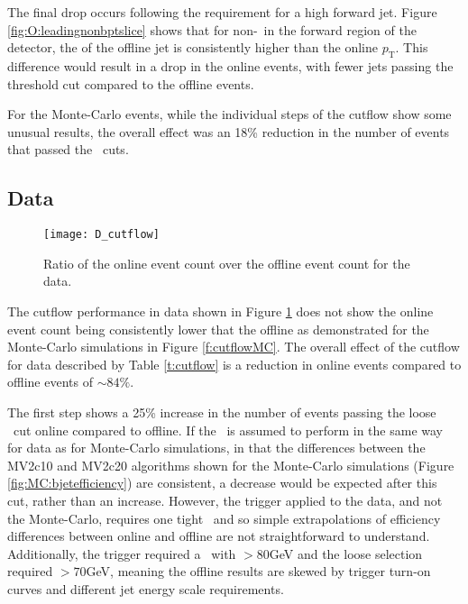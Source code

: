     The final drop occurs following the requirement for a high \pt forward jet. Figure \ref{fig:O:leadingnonbptslice} shows that for non-\bjets\ in the forward region of the detector, the \pt of the offline jet is consistently higher than the online $p_\text{T}$. This difference would result in a drop in the online events, with fewer jets passing the threshold \pt cut compared to the offline events.

    For the Monte-Carlo events, while the individual steps of the cutflow show some unusual results, the overall effect was an 18\% reduction in the number of events that passed the \VBFHBB\, cuts.

    \subsection{Data}
        \begin{figure}[h]
            \centering
            \texttt{[image: D\_cutflow]}
            \caption[\VBFHBB\ Cutflow ratio for data]{Ratio of the online event count over the offline event count for the data.}
            \label{f:cutflowD}
        \end{figure}

    The cutflow performance in data shown in Figure \ref{f:cutflowD} does not show the online event count being consistently lower that the offline as demonstrated for the Monte-Carlo simulations in Figure \ref{f:cutflowMC}. The overall effect of the cutflow for data described by Table \ref{t:cutflow} is a reduction in online events compared to offline events of $\sim84\%$.

    The first step shows a 25\% increase in the number of events passing the loose \bjets\ cut online compared to offline. If the \btag\ is assumed to perform in the same way for data as for Monte-Carlo simulations, in that the differences between the MV2c10 and MV2c20 algorithms shown for the Monte-Carlo simulations (Figure \ref{fig:MC:bjetefficiency}) are consistent, a decrease would be expected after this cut, rather than an increase. However, the trigger applied to the data, and not the Monte-Carlo, requires one tight \bjet\ and so simple extrapolations of efficiency differences between online and offline are not straightforward to understand. Additionally, the trigger required a \bjet\ with \pt$>80$GeV and the loose selection required \bjets$>70$GeV, meaning the offline results are skewed by trigger turn-on curves and different jet energy scale requirements.


